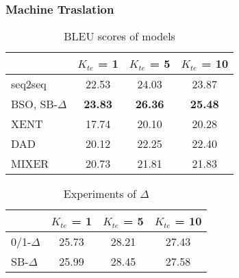 \begin{frame}
  \frametitle{Machine Traslation}
  \begin{table}[t!]
    \centering
    \begin{tabular}{lccc}
      \toprule
        &  $K_{te}$ = 1 & $K_{te}$ = 5 & $K_{te}$ = 10 \\ 
      \midrule
      seq2seq & 22.53 & 24.03 & 23.87 \\
      BSO, SB-$\Delta$ & \textbf{23.83} & \textbf{26.36} & \textbf{25.48} \\
      \midrule
      XENT & 17.74 & 20.10 & 20.28 \\
      DAD & 20.12 & 22.25 & 22.40 \\ 
      MIXER & 20.73 & 21.81 & 21.83 \\    
      \bottomrule
    \end{tabular}
    \caption{BLEU scores of models}
    \label{tab:mtfinal}
  \end{table}


  \begin{table}[t!]
    \centering
    \begin{tabular}{lccc}
      \toprule
      &  $K_{te}$ = 1 & $K_{te}$ = 5 & $K_{te}$ = 10 \\ 
      \midrule
      0/1-$\Delta$ & 25.73  & 28.21 & 27.43  \\  
      SB-$\Delta$ & 25.99  & 28.45 & 27.58 \\  
      \bottomrule
    \end{tabular}
    \caption{Experiments of $\Delta$}
    \label{tab:mtdelt}
  \end{table}

\end{frame}


